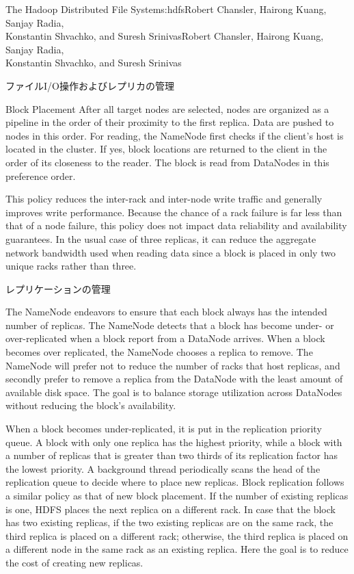 \begin{aosachaptertoc}{The Hadoop Distributed File System}{s:hdfs}{Robert Chansler, Hairong Kuang, Sanjay Radia, \\ Konstantin Shvachko, and Suresh Srinivas}{Robert Chansler, Hairong Kuang, Sanjay Radia, \\ \hspace*{0.9cm} Konstantin Shvachko, and Suresh Srinivas}
\begin{aosasect1}{ファイルI/O操作およびレプリカの管理}
\begin{aosasect2}{Block Placement}
After all target nodes are selected, nodes are organized as a pipeline
in the order of their proximity to the first replica. Data are pushed
to nodes in this order. For reading, the NameNode first checks if the
client's host is located in the cluster. If yes, block locations are
returned to the client in the order of its closeness to the
reader. The block is read from DataNodes in this preference order.

This policy reduces the inter-rack and inter-node write traffic and
generally improves write performance. Because the chance of a rack
failure is far less than that of a node failure, this policy does not
impact data reliability and availability guarantees. In the usual case
of three replicas, it can reduce the aggregate network bandwidth used
when reading data since a block is placed in only two unique racks
rather than three.

\end{aosasect2}

\begin{aosasect2}{レプリケーションの管理}

The NameNode endeavors to ensure that each block always has the
intended number of replicas. The NameNode detects that a block has
become under- or over-replicated when a block report from a DataNode
arrives. When a block becomes over replicated, the NameNode chooses a
replica to remove. The NameNode will prefer not to reduce the number
of racks that host replicas, and secondly prefer to remove a replica
from the DataNode with the least amount of available disk space. The
goal is to balance storage utilization across DataNodes without
reducing the block's availability.

When a block becomes under-replicated, it is put in the replication
priority queue. A block with only one replica has the highest
priority, while a block with a number of replicas that is greater than
two thirds of its replication factor has the lowest priority. A
background thread periodically scans the head of the replication queue
to decide where to place new replicas. Block replication follows a
similar policy as that of new block placement. If the number of
existing replicas is one, HDFS places the next replica on a different
rack.  In case that the block has two existing replicas, if the two
existing replicas are on the same rack, the third replica is placed on
a different rack; otherwise, the third replica is placed on a
different node in the same rack as an existing replica. Here the goal
is to reduce the cost of creating new replicas.


\end{aosasect2}
\end{aosasect1}
\end{aosachaptertoc}
